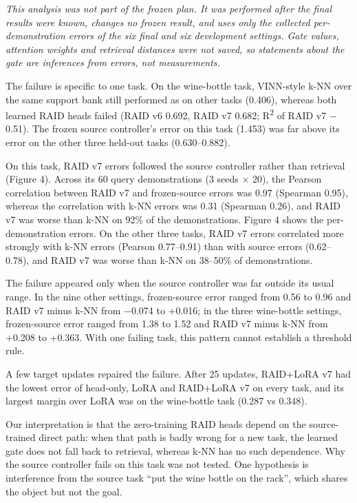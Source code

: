 \documentclass[11pt,a4paper]{article}
\begin{document}

\emph{This analysis was not part of the frozen plan. It was performed after the final results were known, changes no frozen result, and uses only the collected per-demonstration errors of the six final and six development settings. Gate values, attention weights and retrieval distances were not saved, so statements about the gate are inferences from errors, not measurements.}

The failure is specific to one task. On the wine-bottle task, VINN-style k-NN over the same support bank still performed as on other tasks (0.406), whereas both learned RAID heads failed (RAID v6 0.692, RAID v7 0.682; R\textsuperscript{2} of RAID v7 \ensuremath{-}0.51). The frozen source controller's error on this task (1.453) was far above its error on the other three held-out tasks (0.630--0.882).

On this task, RAID v7 errors followed the source controller rather than retrieval (Figure 4). Across its 60 query demonstrations (3 seeds \ensuremath{\times} 20), the Pearson correlation between RAID v7 and frozen-source errors was 0.97 (Spearman 0.95), whereas the correlation with k-NN errors was 0.31 (Spearman 0.26), and RAID v7 was worse than k-NN on 92\% of the demonstrations. Figure 4 shows the per-demonstration errors. On the other three tasks, RAID v7 errors correlated more strongly with k-NN errors (Pearson 0.77--0.91) than with source errors (0.62--0.78), and RAID v7 was worse than k-NN on 38--50\% of demonstrations.

The failure appeared only when the source controller was far outside its usual range. In the nine other settings, frozen-source error ranged from 0.56 to 0.96 and RAID v7 minus k-NN from \ensuremath{-}0.074 to +0.016; in the three wine-bottle settings, frozen-source error ranged from 1.38 to 1.52 and RAID v7 minus k-NN from +0.208 to +0.363. With one failing task, this pattern cannot establish a threshold rule.

A few target updates repaired the failure. After 25 updates, RAID+LoRA v7 had the lowest error of head-only, LoRA and RAID+LoRA v7 on every task, and its largest margin over LoRA was on the wine-bottle task (0.287 vs 0.348).

Our interpretation is that the zero-training RAID heads depend on the source-trained direct path: when that path is badly wrong for a new task, the learned gate does not fall back to retrieval, whereas k-NN has no such dependence. Why the source controller fails on this task was not tested. One hypothesis is interference from the source task ``put the wine bottle on the rack'', which shares the object but not the goal.
\end{document}
